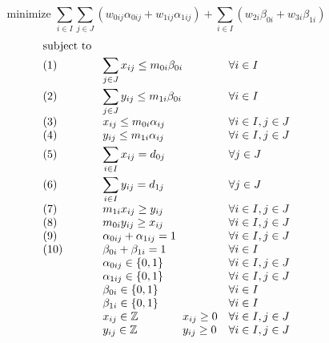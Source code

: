 \begin{equation*}
\text{minimize } \displaystyle\sum\limits_{i \in I}^{}\sum\limits_{j \in J}^{} (w_{0ij} \alpha_{0ij} + w_{1ij} \alpha_{1ij}) + \sum\limits_{i \in I}^{} (w_{2i} \beta_{0i} + w_{3i} \beta_{1i})
\end{equation*}
\begin{equation*}
\begin{array}{ll@{}ll}
\text{subject to} & & &\\
\text{(1)}           & \displaystyle\sum\limits_{j \in J}^{} x_{ij} \leq m_{0i} \beta_{0i}  & & \forall i \in I\\
\text{(2)}           & \displaystyle\sum\limits_{j \in J}^{} y_{ij} \leq m_{1i} \beta_{0i} & & \forall i \in I\\
\text{(3)}           & \displaystyle  x_{ij} \leq m_{0i} \alpha_{ij} & & \forall i \in I, j \in J\\
\text{(4)}           & \displaystyle y_{ij} \leq m_{1i} \alpha_{ij} & & \forall i \in I, j \in J\\
\text{(5)}           & \displaystyle\sum\limits_{i \in I}^{} x_{ij} = d_{0j} & & \forall j \in J\\
\text{(6)}           & \displaystyle\sum\limits_{i \in I}^{} y_{ij} = d_{1j} & & \forall j \in J\\
\text{(7)}           & \displaystyle m_{1i} x_{ij} \geq y_{ij} & & \forall i \in I, j \in J\\
\text{(8)}           & \displaystyle m_{0i} y_{ij} \geq x_{ij} & & \forall i \in I, j \in J\\
\text{(9)}           & \displaystyle \alpha_{0ij} + \alpha_{1ij} = 1 & & \forall i \in I, j \in J\\
\text{(10)}          & \displaystyle \beta_{0i} + \beta_{1i} = 1 & & \forall i \in I\\
                     & \alpha_{0ij} \in \{0, 1\}  & & \forall i \in I, j \in J\\
                     & \alpha_{1ij} \in \{0, 1\}  & & \forall i \in I, j \in J\\
                     & \beta_{0i} \in \{0, 1\}  & & \forall i \in I\\
                     & \beta_{1i} \in \{0, 1\}  & & \forall i \in I\\
                     & x_{ij} \in \mathbb{Z}  & x_{ij} \geq 0 & \forall i \in I, j \in J\\
                     & y_{ij} \in \mathbb{Z}  & y_{ij} \geq 0 & \forall i \in I, j \in J\\
\end{array}
\end{equation*}
